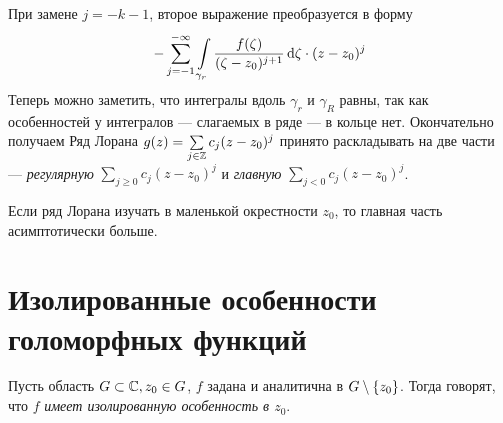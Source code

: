 \documentclass[a4paper]{report}
\begin{document}
{{    При замене $j = -k - 1$, второе выражение преобразуется в форму
    \[-\sum\limits_{j = -1}^{-\infty}\int\limits_{\gamma_r}\frac{f(\zeta)}{(\zeta - z_0)^{j+1}}\operatorname{d}\!\zeta\cdot (z - z_0)^j\]
    Теперь можно заметить, что интегралы вдоль $\gamma_r$ и $\gamma_R$ равны, так как особенностей у интегралов --- слагаемых в ряде --- в кольце нет. Окончательно получаем
    }
    }
    Ряд Лорана $g(z) = \sum\limits_{j \in \mathbb{Z}}c_j(z - z_0)^j$ принято раскладывать на две части --- \emph{регулярную} $\sum\limits_{j \ge 0}c_j (z - z_0)^j$ и \emph{главную} $\sum\limits_{j < 0} c_j (z - z_0)^j$.

    Если ряд Лорана изучать в маленькой окрестности $z_0$, то главная часть асимптотически больше.
    \section{Изолированные особенности голоморфных функций}
    Пусть область $G \subset \mathbb{C}, z_0 \in G$, $f$ задана и аналитична в $G \setminus \{z_0\}$.
    Тогда говорят, что $f$ \emph{имеет изолированную особенность в $z_0$}.
\end{document}
